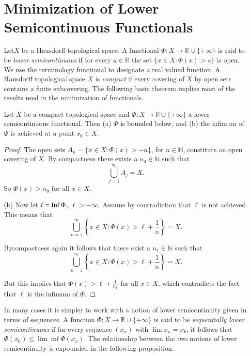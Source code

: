 \chapter{Minimization of Lower Semicontinuous
  Functionals}\label{chap1}

Let\pageoriginale $X$ be a Hausdorff topological space. A functional
$\Phi:X\to \mathbb{R}\cup\{+\infty\}$ is said to be {\em lower
  semicontinuous} if for every $a\in \mathbb{R}$ the set $\{x\in
X:\Phi(x)>a\}$ is open. We use the terminology functional to designate
a real valued function. A Hausdorff topological space $X$ is {\em
  compact} if every covering of $X$ by open sets contains a finite
subcovering. The following basic theorem implies most of the results
used in the minimization of functionals.

\begin{theorem}\label{chap1-thm1.1}
Let $X$ be a compact topological space and $\Phi:X\to \mathbb{R}\cup
\{+\infty\}$ a lower semicontinuous functional. Then {\rm(a)} $\Phi$
is bounded below, and {\rm(b)} the infimum of $\Phi$ is achieved at a
point $x_{0}\in X$.
\end{theorem}

\begin{proof}
The open sets $A_{n}=\{x\in X:\Phi(x)>-n\}$, for $n\in \mathbb{N}$,
constitute an open covering of $X$. By compactness there exists a
$n_{0}\in \mathbb{N}$ such that
$$
\bigcup\limits^{n_{0}}_{j=1}A_{j}=X.
$$
So $\Phi(x)>n_{0}$ for all $x\in X$.

(b) Now let $\ell=\operatorname{Inf} \Phi$, $\ell>-\infty$. Assume by contradiction
that $\ell$ is not achieved. This means that
$$
\bigcup\limits^{\infty}_{n=1}\left\{x\in
X:\Phi(x)>\ell+\frac{1}{n}\right\}=X. 
$$

By\pageoriginale compactness again it follows that there exist a
$n_{1}\in \mathbb{N}$ such that
$$
\bigcup\limits^{n_{1}}_{n=1}\left\{x\in
X:\Phi(x)>\ell+\frac{1}{n}\right\}=X. 
$$

But this implies that $\Phi(x)>\ell +\frac{1}{n_{1}}$ for all $x\in
X$, which contradicts the fact that $\ell$ is the infimum of $\Phi$.
\end{proof}

In many cases it is simpler to work with a notion of lower
semicontinuity given in terms of sequences. A function $\Phi:X\to
\mathbb{R}\cup\{+\infty\}$ is said to be {\em sequentially lower
  semicontinuous} if for every sequence $(x_{n})$ with $\lim
x_{n}=x_{0}$, it follows that $\Phi(x_{0})\leq \lim \inf
\Phi(x_{n})$. The relationship between the two notions of lower
semicontinuity is expounded in the following proposition. 

